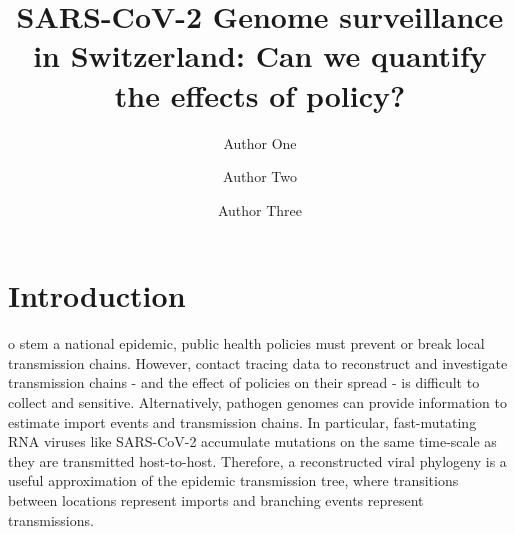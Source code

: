 \documentclass[9pt,twocolumn,twoside,lineno]{pnas-new}
\title{SARS-CoV-2 Genome surveillance in Switzerland: Can we quantify the effects of policy?}
\author[a,c,1]{Author One}
\author[b,1,2]{Author Two}
\author[a]{Author Three}
\affil[a]{Affiliation One}
\affil[b]{Affiliation Two}
\affil[c]{Affiliation Three}
\begin{document}
\maketitle
\thispagestyle{firststyle}



\section{Introduction}

o stem a national epidemic, public health policies must prevent or break local transmission chains. However, contact tracing data to reconstruct and investigate transmission chains - and the effect of policies on their spread - is difficult to collect and sensitive. Alternatively, pathogen genomes can provide information to estimate import events and transmission chains. In particular, fast-mutating RNA viruses like SARS-CoV-2 accumulate mutations on the same time-scale as they are transmitted host-to-host.  Therefore, a reconstructed viral phylogeny is a useful approximation of the epidemic transmission tree, where transitions between locations represent imports and branching events represent transmissions.
\end{document}

